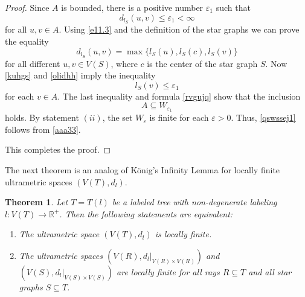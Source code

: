 \documentclass[pdflatex,sn-mathphys-num]{sn-jnl}%
\newtheorem{theorem}{Theorem}%
\theoremstyle{thmstyletwo}%
\begin{document}
\begin{proof}
Since $A$ is bounded, there is a positive number $\varepsilon_1$ such that
\begin{equation}\label{kuhgs}
d_{l_S}(u, v) \leq \varepsilon_1 < \infty 
\end{equation}
for all $u, v \in A.$
Using \eqref{e11.3}
and the definition of the star graphs we can prove the equality
\begin{equation}\label{olidhh}
d_{l_S}(u,v) = \max\{l_S(u), l_S(c), l_S(v)\} 
\end{equation}
for all different $u,v \in V(S)$, where $c$ is the center of the star graph $S$. Now \eqref{kuhgs} and \eqref{olidhh} imply the inequality
\begin{equation*}
l_S(v) \leq \varepsilon_1 
\end{equation*}
for each $v \in A$.
The last inequality and formula \eqref{rvgujq} show that the inclusion
\begin{equation}\label{aaa33}
A \subseteq W_{\varepsilon_1} 
\end{equation}
holds. By statement $(ii)$, the set $W_{\varepsilon}$ is finite for each $\varepsilon > 0$.
Thus, \eqref{qswssej1} follows from \eqref{aaa33}.

This completes the proof.

\end{proof}

The next theorem is an analog of König's Infinity Lemma for locally finite ultrametric spaces $(V(T), d_l)$.


\begin{theorem}\label{dster}
Let $T = T(l)$ be a labeled tree with non-degenerate labeling $l \colon V(T) \to \mathbb{R}^+$. Then the following statements are equivalent:

\begin{enumerate}[label=\textit{(\roman*)}, left=0pt] 
\item The ultrametric space $(V(T), d_l)$ is locally finite.

\item The ultrametric spaces $(V(R), d_l|_{V(R) \times V(R)})$ and $(V(S), d_l|_{V(S) \times V(S)})$ are locally finite for all rays $R \subseteq T$ and all star graphs $S \subseteq T$.
\end{enumerate}
\end{theorem}
\end{document}
